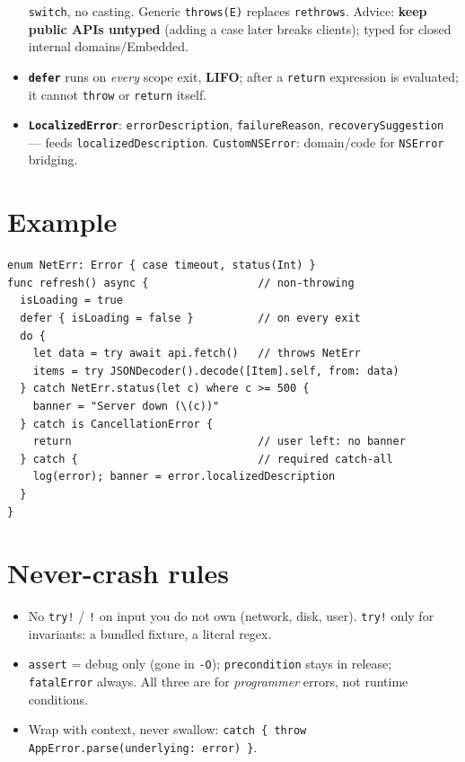\documentclass[8pt]{extarticle}
\begin{document}
\begin{multicols}{2}
\begin{itemize}
        \texttt{switch}, no casting. Generic \texttt{throws(E)} replaces
        \texttt{rethrows}. Advice: \textbf{keep public APIs untyped} (adding
        a case later breaks clients); typed for closed internal domains/Embedded.
  \item \textbf{\texttt{defer}} runs on \emph{every} scope exit, \textbf{LIFO};
        after a \texttt{return} expression is evaluated; it cannot
        \texttt{throw} or \texttt{return} itself.
  \item \textbf{\texttt{LocalizedError}}: \texttt{errorDescription},
        \texttt{failureReason}, \texttt{recoverySuggestion} — feeds
        \texttt{localizedDescription}. \texttt{CustomNSError}: domain/code for
        \texttt{NSError} bridging.
\end{itemize}

\section{Example}
\begin{lstlisting}[language=SwiftSheet]
enum NetErr: Error { case timeout, status(Int) }
func refresh() async {                 // non-throwing
  isLoading = true
  defer { isLoading = false }          // on every exit
  do {
    let data = try await api.fetch()   // throws NetErr
    items = try JSONDecoder().decode([Item].self, from: data)
  } catch NetErr.status(let c) where c >= 500 {
    banner = "Server down (\(c))"
  } catch is CancellationError {
    return                             // user left: no banner
  } catch {                            // required catch-all
    log(error); banner = error.localizedDescription
  }
}
\end{lstlisting}

\section{Never-crash rules}
\begin{itemize}
  \item No \texttt{try!} / \texttt{!} on input you do not own (network, disk,
        user). \texttt{try!} only for invariants: a bundled fixture, a literal regex.
  \item \texttt{assert} = debug only (gone in \texttt{-O});
        \texttt{precondition} stays in release; \texttt{fatalError} always.
        All three are for \emph{programmer} errors, not runtime conditions.
  \item Wrap with context, never swallow:
        \texttt{catch \{ throw AppError.parse(underlying: error) \}}.
\end{itemize}


\end{multicols}
\end{document}
